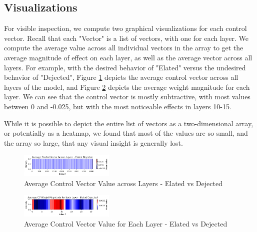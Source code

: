 \documentclass[11pt,a4paper]{article}
\begin{document}
%


\subsection{Visualizations}
For visible inspection, we compute two graphical visualizations for each control vector. Recall that each "Vector" is a list of vectors, with one for each layer. We compute the average value across all individual vectors in the array to get the average magnitude of effect on each layer, as well as the average vector across all layers. For example, with the desired behavior of "Elated" versus the undesired behavior of "Dejected", Figure \ref{fig:elated_effect} depicts the average control vector across all layers of the model, and Figure \ref{fig:elated_mag} depicts the average weight magnitude for each layer. We can see that the control vector is mostly subtractive, with most values between 0 and -0.025, but with the most noticeable effects in layers 10-15.

While it is possible to depict the entire list of vectors as a two-dimensional array, or potentially as a heatmap, we found that most of the values are so small, and the array so large, that any visual insight is generally lost.

\begin{figure}[!ht]
\centering
\includegraphics[width = 0.4\textwidth]{assets/Elated_Dejected_mean_values.png}
\caption{Average Control Vector Value across Layers - Elated vs Dejected}
\label{fig:elated_effect}
\end{figure}

\begin{figure}[!ht]
\centering
\includegraphics[width = 0.4\textwidth]{assets/Elated_Dejected_mean_values_trans.png}
\caption{Average Control Vector Value for Each Layer - Elated vs Dejected}
\label{fig:elated_mag}
\end{figure}
\end{document}
